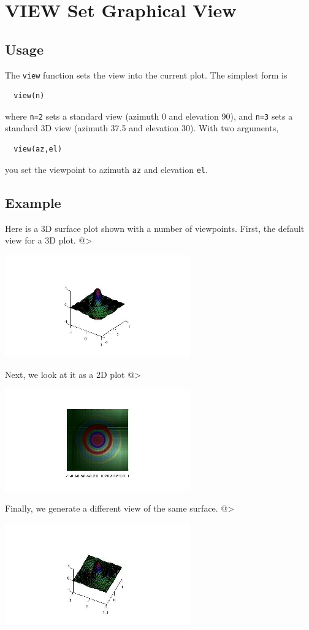 \section{VIEW Set Graphical View}

\subsection{Usage}

The \verb|view| function sets the view into the current plot.
The simplest form is
\begin{verbatim}
  view(n)
\end{verbatim}
where \verb|n=2| sets a standard view (azimuth 0 and elevation 90),
and \verb|n=3| sets a standard 3D view (azimuth 37.5 and elevation 30).
With two arguments,
\begin{verbatim}
  view(az,el)
\end{verbatim}
you set the viewpoint to azimuth \verb|az| and elevation \verb|el|.
\subsection{Example}

Here is a 3D surface plot shown with a number of viewpoints.
First, the default view for a 3D plot.
@>


\centerline{\includegraphics[width=8cm]{view1}}

Next, we look at it as a 2D plot
@>


\centerline{\includegraphics[width=8cm]{view2}}

Finally, we generate a different view of the same surface.
@>


\centerline{\includegraphics[width=8cm]{view3}}

